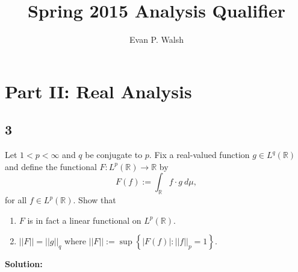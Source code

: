 \documentclass[12pt]{article}
\title{Spring 2015 Analysis Qualifier}
\author{Evan P. Walsh}
\begin{document}

\section*{Part II: Real Analysis}

\subsection*{3}
Let $1 < p < \infty$ and $q$ be conjugate to $p$. Fix a real-valued function $g \in L^{q}(\mathbb{R})$ and define the functional $F :
L^{p}(\mathbb{R}) \rightarrow \mathbb{R}$ by 
\[ F(f) := \int_{\mathbb{R}}f\cdot g \ d\mu, \]
for all $f \in L^{p}(\mathbb{R})$. Show that 
\begin{enumerate}[label=(\roman*)]
\item $F$ is in fact a linear functional on $L^{p}(\mathbb{R})$.
\item $||F|| = ||g||_{q}$ where $||F|| := \sup\left\{ |F(f)| : ||f||_{p} = 1 \right\}$.
\end{enumerate}

{\bf Solution:}
\end{document}
